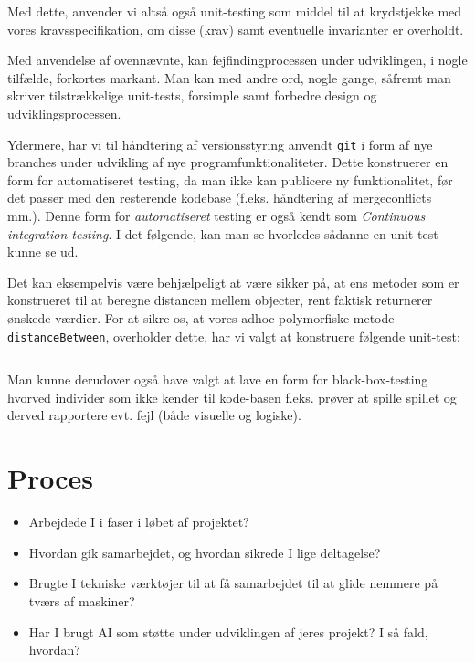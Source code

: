 \documentclass{article}
\newcommand{\code}[1]{\small\texttt{#1}}
\newcommand{\snippet}[3]{\inputminted[firstline=#1,lastline=#2,linenos,
xleftmargin=1.5em, breaklines]{java}{#3}}
\theoremstyle{mytheoremstyle}
\theoremstyle{mytheoremstyle}
\theoremstyle{myproblemstyle}
\begin{document}
Med dette, anvender vi altså også unit-testing som middel til at krydstjekke med
vores kravsspecifikation, om disse (krav) samt eventuelle invarianter er
overholdt.

Med anvendelse af ovennævnte, kan fejfindingprocessen under udviklingen, i nogle
tilfælde, forkortes markant. Man kan med andre ord, nogle gange, såfremt man
skriver tilstrækkelige unit-tests, forsimple samt forbedre design og
udviklingsprocessen.

Ydermere, har vi til håndtering af versionsstyring anvendt \code{git} i form af
nye branches under udvikling af nye programfunktionaliteter. Dette konstruerer
en form for automatiseret testing, da man ikke kan publicere ny funktionalitet,
før det passer med den resterende kodebase (f.eks. håndtering af mergeconflicts
mm.). Denne form for \textit{automatiseret} testing er også kendt som
\textit{Continuous integration testing}. I det følgende, kan man se hvorledes sådanne en unit-test kunne se ud.

Det kan eksempelvis være behjælpeligt at være sikker på, at ens metoder som er konstrueret til at beregne distancen mellem objecter, rent faktisk returnerer ønskede værdier. For at sikre os, at vores adhoc polymorfiske metode \code{distanceBetween}, overholder dette, har vi valgt at konstruere følgende unit-test:
\snippet{12}{55}{./code/AlgebraTest.java}

Man kunne derudover også have valgt at lave en form for black-box-testing hvorved individer som ikke kender til kode-basen f.eks. prøver at spille spillet og derved rapportere evt. fejl (både visuelle og logiske).

\section{Proces}\label{sec:Proces} %
\begin{itemize}
  \item Arbejdede I i faser i løbet af projektet?
  \item Hvordan gik samarbejdet, og hvordan sikrede I lige deltagelse?
  \item Brugte I tekniske værktøjer til at få samarbejdet til at glide nemmere
  på tværs af maskiner?
  \item Har I brugt AI som støtte under udviklingen af jeres projekt? I så fald,
  hvordan?
\end{itemize}
\end{document}
